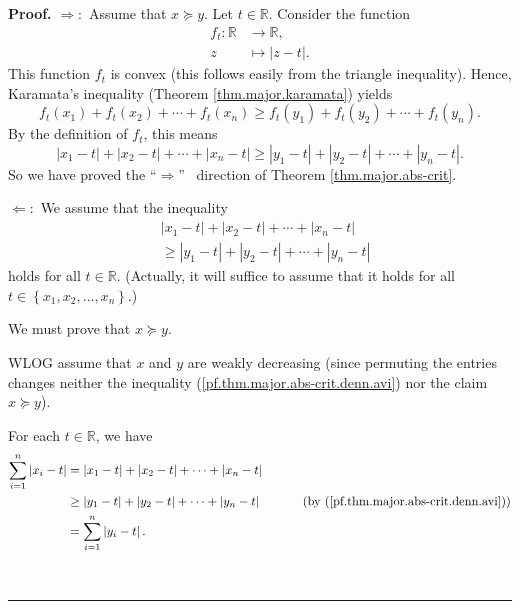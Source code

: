 \documentclass[numbers=enddot,12pt,final,onecolumn,notitlepage]{scrartcl}%
\numberwithin{exer}{subsection}
\theoremstyle{definition}
\newenvironment{proof}[1][Proof]{\noindent\textbf{#1.} }{\ \rule{0.5em}{0.5em}}
\let\sumnonlimits\sum
\renewcommand{\sum}{\sumnonlimits\limits}
\begin{document}
\begin{proof}
$\Longrightarrow:$ Assume that $x\succcurlyeq y$. Let $t\in\mathbb{R}$.
Consider the function%
\begin{align*}
f_{t}:\mathbb{R}  &  \rightarrow\mathbb{R},\\
z  &  \mapsto\left\vert z-t\right\vert .
\end{align*}
This function $f_{t}$ is convex (this follows easily from the triangle
inequality). Hence, Karamata's inequality (Theorem \ref{thm.major.karamata})
yields%
\[
f_{t}\left(  x_{1}\right)  +f_{t}\left(  x_{2}\right)  +\cdots+f_{t}\left(
x_{n}\right)  \geq f_{t}\left(  y_{1}\right)  +f_{t}\left(  y_{2}\right)
+\cdots+f_{t}\left(  y_{n}\right)  .
\]
By the definition of $f_{t}$, this means
\[
\left\vert x_{1}-t\right\vert +\left\vert x_{2}-t\right\vert +\cdots
+\left\vert x_{n}-t\right\vert \geq\left\vert y_{1}-t\right\vert +\left\vert
y_{2}-t\right\vert +\cdots+\left\vert y_{n}-t\right\vert .
\]
So we have proved the \textquotedblleft$\Longrightarrow$\textquotedblright%
\ direction of Theorem \ref{thm.major.abs-crit}. \medskip

$\Longleftarrow:$ We assume that the inequality%
\begin{align}
&  \left\vert x_{1}-t\right\vert +\left\vert x_{2}-t\right\vert +\cdots
+\left\vert x_{n}-t\right\vert \nonumber\\
&  \geq\left\vert y_{1}-t\right\vert +\left\vert y_{2}-t\right\vert
+\cdots+\left\vert y_{n}-t\right\vert \label{pf.thm.major.abs-crit.denn.avi}%
\end{align}
holds for all $t\in\mathbb{R}$. (Actually, it will suffice to assume that it
holds for all $t\in\left\{  x_{1},x_{2},\ldots,x_{n}\right\}  $.)

We must prove that $x\succcurlyeq y$.

WLOG assume that $x$ and $y$ are weakly decreasing (since permuting the
entries changes neither the inequality (\ref{pf.thm.major.abs-crit.denn.avi})
nor the claim $x\succcurlyeq y$).

For each $t\in\mathbb{R}$, we have%
\begin{align}
\sum_{i=1}^{n}\left\vert x_{i}-t\right\vert  &  =\left\vert x_{1}-t\right\vert
+\left\vert x_{2}-t\right\vert +\cdots+\left\vert x_{n}-t\right\vert
\nonumber\\
&  \geq\left\vert y_{1}-t\right\vert +\left\vert y_{2}-t\right\vert
+\cdots+\left\vert y_{n}-t\right\vert \ \ \ \ \ \ \ \ \ \ \left(  \text{by
(\ref{pf.thm.major.abs-crit.denn.avi})}\right) \nonumber\\
&  =\sum_{i=1}^{n}\left\vert y_{i}-t\right\vert .
\label{pf.thm.major.abs-crit.denn.avi2}%
\end{align}



\end{proof}
\end{document}
